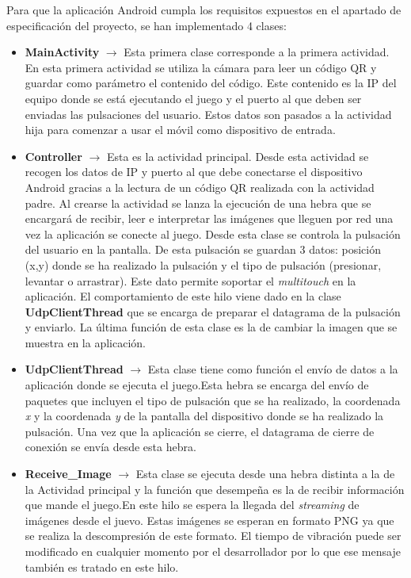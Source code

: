 Para que la aplicaci\'on Android cumpla los requisitos expuestos en el apartado de especificaci\'on del proyecto, se han implementado 4 clases:

\begin {itemize}
\item \textbf{MainActivity} $\rightarrow$ Esta primera clase corresponde a la primera actividad. En esta primera actividad se utiliza la c\'amara para leer un c\'odigo QR y guardar como par\'ametro el contenido del c\'odigo. Este contenido es la IP del equipo donde se est\'a ejecutando el juego y el puerto al que deben ser enviadas las pulsaciones del usuario. Estos datos son pasados a la actividad hija para comenzar a usar el m\'ovil como dispositivo de entrada.
\item \textbf{Controller} $\rightarrow$ Esta es la actividad principal. Desde esta actividad se recogen los datos de IP y puerto al que debe conectarse el dispositivo Android gracias a la lectura de un c\'odigo QR realizada con la actividad padre. Al crearse la actividad se lanza la ejecuci\'on de una hebra que se encargar\'a de recibir, leer e interpretar las im\'agenes que lleguen por red una vez la aplicaci\'on se conecte al juego. Desde esta clase se controla la pulsaci\'on del usuario en la pantalla. De esta pulsaci\'on se guardan 3 datos: posici\'on (x,y) donde se ha realizado la pulsaci\'on y el tipo de pulsaci\'on (presionar, levantar o arrastrar). Este dato permite soportar el \textit{multitouch} en la aplicaci\'on. El comportamiento de este hilo viene dado en la clase \textbf{UdpClientThread} que se encarga de preparar el datagrama de la pulsaci\'on y enviarlo. La \'ultima funci\'on de esta clase es la de cambiar la imagen que se muestra en la aplicaci\'on. 

\item \textbf{UdpClientThread} $\rightarrow$ Esta clase tiene como funci\'on el env\'io de datos a la aplicaci\'on donde se ejecuta el juego.Esta hebra se encarga del env\'io de paquetes que incluyen el tipo de pulsaci\'on que se ha realizado, la coordenada \textit{x} y la coordenada \textit{y} de la pantalla del dispositivo donde se ha realizado la pulsaci\'on. Una vez que la aplicaci\'on se cierre, el datagrama de cierre de conexi\'on se env\'ia desde esta hebra.

\item \textbf{Receive\_Image} $\rightarrow$ Esta clase se ejecuta desde una hebra distinta a la de la Actividad principal y la funci\'on que desempe\~na es la de recibir informaci\'on que mande el juego.En este hilo se espera la llegada del \textit{streaming} de im\'agenes desde el juevo. Estas im\'agenes se esperan en formato PNG ya que se realiza la descompresi\'on de este formato. El tiempo de vibraci\'on puede ser modificado en cualquier momento por el desarrollador por lo que ese mensaje tambi\'en es tratado en este hilo.
\end {itemize}


